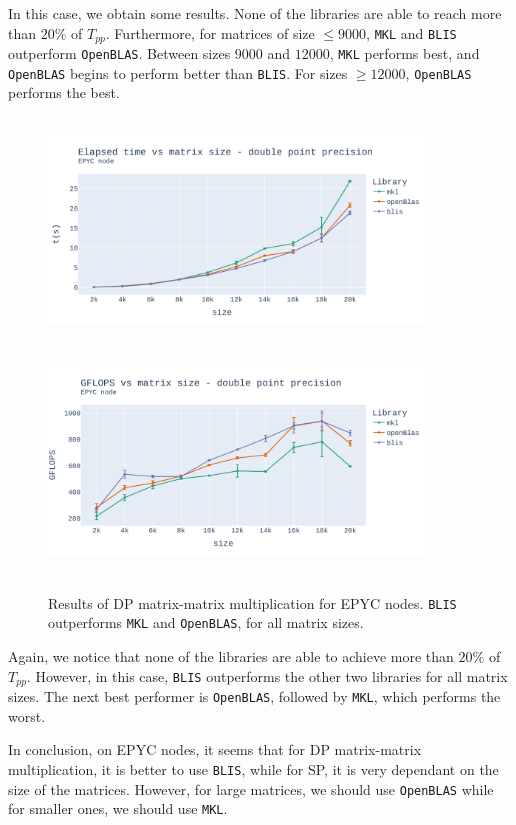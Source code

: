 \documentclass{report}
\begin{document}
In this case, we obtain some results. None of the libraries are able to reach 
more than $20\%$ of $T_{pp}$. Furthermore, for matrices of size $\leq 9000$, 
\texttt{MKL} and \texttt{BLIS} outperform \texttt{OpenBLAS}. Between sizes 
$9000$ and $12000$, \texttt{MKL} performs best, and \texttt{OpenBLAS} begins to 
perform better than \texttt{BLIS}. For sizes $\geq 12000$, \texttt{OpenBLAS} 
performs the best.

\begin{figure}[h!p]
\hspace*{-2.5cm}
\includegraphics[width=10cm, height=6cm]{./images/fixed_cores_epyc_double_time.pdf}
\includegraphics[width=10cm, height=6cm]{./images/fixed_cores_epyc_double_gflops.pdf}
\caption{\label{fig:fixed_cores_epyc_double} Results of DP matrix-matrix multiplication 
for EPYC nodes. \texttt{BLIS} outperforms \texttt{MKL} and \texttt{OpenBLAS}, 
for all matrix sizes.}

\end{figure}
Again, we notice that none of the libraries are able to achieve more than $20\%$ 
of $T_{pp}$. However, in this case, \texttt{BLIS} outperforms the other two libraries 
for all matrix sizes. The next best performer is \texttt{OpenBLAS}, followed by 
\texttt{MKL}, which performs the worst.

In conclusion, on EPYC nodes, it seems that for DP matrix-matrix multiplication, 
it is better to use \texttt{BLIS}, while for SP, it is very dependant on the 
size of the matrices. However, for large matrices, we should use \texttt{OpenBLAS}
while for smaller ones, we should use \texttt{MKL}. 
\end{document}
